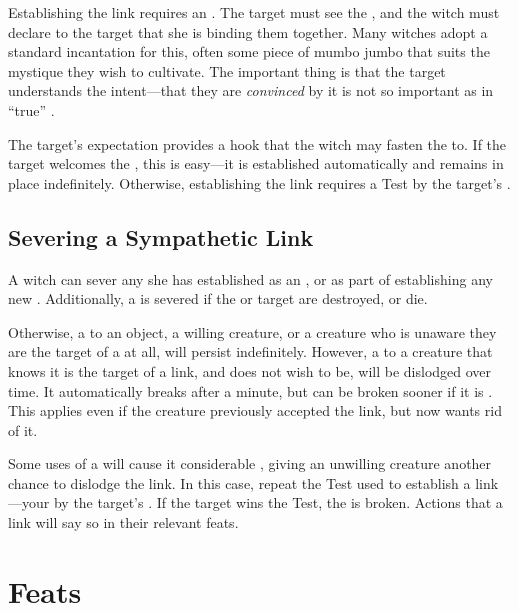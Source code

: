 Establishing the link requires an {\action}.
The target must see the {\symbol}, and the witch must declare to the target that she is binding them together.
Many witches adopt a standard incantation for this, often some piece of mumbo jumbo that suits the mystique they wish to cultivate.
The important thing is that the target understands the intent---that they are \emph{convinced} by it is not so important as in ``true'' .

The target's expectation provides a hook that the witch may fasten the {\symlink} to.
If the target welcomes the {\symlink}, this is easy---it is established automatically and remains in place indefinitely.
Otherwise, establishing the link requires a  Test {\opposed} by the target's .

\subsection{Severing a Sympathetic Link}

A witch can sever any {\symlink} she has established as an {\action}, or as part of establishing any new {\symlink}.
Additionally, a {\symlink} is severed if the {\symbol} or target are destroyed, or die.

Otherwise, a {\symlink} to an object, a willing creature, or a creature who is unaware they are the target of a {\symlink} at all, will persist indefinitely.
However, a {\symlink} to a creature that knows it is the target of a link, and does not wish to be, will be dislodged over time.
It automatically breaks after a minute, but can be broken sooner if it is {\stressed}.
This applies even if the creature previously accepted the link, but now wants rid of it.

Some uses of a {\symlink} will cause it considerable {\stress}, giving an unwilling creature another chance to dislodge the link.
In this case, repeat the Test used to establish a link---your  {\opposed} by the target's .
If the target wins the Test, the {\symlink} is broken.
Actions that {\stress} a link will say so in their relevant feats.

\section{Feats}


